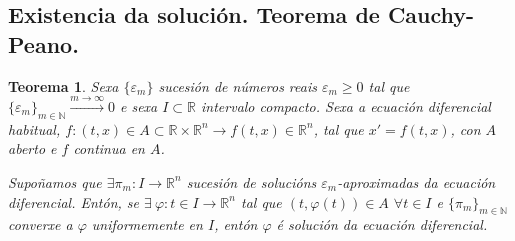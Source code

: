 \documentclass[11pt, a4paper,twoside]{article}
\theoremstyle{theorem-style}  %
\newtheorem{theorem}{Teorema}[section]  %
\theoremstyle{definition-style}
\theoremstyle{example-style}
\begin{document}
\subsection{Existencia da solución. Teorema de Cauchy-Peano.}
\begin{theorem}\label{thm:sucesion}
	Sexa $\{\varepsilon_m\}$ sucesión de números reais $\varepsilon_m \geq 0$ tal que $\{\varepsilon_m\}_{m\in \mathbb{N}}\xrightarrow{m\to \infty}0$ e sexa $I \subset \mathbb{R}$ intervalo compacto. 
	Sexa a ecuación diferencial habitual, $ f:(t,x) \in A \subset \mathbb{R}\times \mathbb{R}^n\longrightarrow f(t,x)\in \mathbb{R}^n$, tal que $ x'=f(t,x) $, con $A$ aberto e $f$ continua en $A$.
	
	Supoñamos que $\exists \pi_m : I \longrightarrow \mathbb{R}^n$ sucesión de solucións $\varepsilon_m$-aproximadas da ecuación diferencial. Entón, se $\exists \ \varphi : t \in I \longrightarrow \mathbb{R}^n$ tal que $(t, \varphi (t)) \in A$ $\forall t \in I$ e $\{\pi_m\}_{m\in \mathbb{N}}$ converxe a $\varphi$ uniformemente en $I$, entón $\varphi$ é solución da ecuación diferencial. 
\end{theorem}
\end{document}
